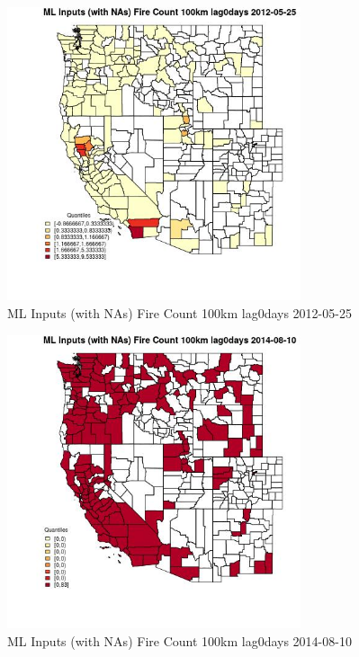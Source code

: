 \begin{figure} 
\centering  
\includegraphics[width=0.77\textwidth]{Code_Outputs/Report_ML_input_PM25_Step4_part_e_de_duplicated_aves_compiled_2019-05-18wNAs_CountyFire_Count_100km_lag0daysMean2012-05-25_2012-05-25.jpg} 
\caption{\label{fig:Report_ML_input_PM25_Step4_part_e_de_duplicated_aves_compiled_2019-05-18wNAsCountyFire_Count_100km_lag0daysMean2012-05-25_2012-05-25}ML Inputs (with NAs) Fire Count 100km lag0days 2012-05-25} 
\end{figure} 
 

\begin{figure} 
\centering  
\includegraphics[width=0.77\textwidth]{Code_Outputs/Report_ML_input_PM25_Step4_part_e_de_duplicated_aves_compiled_2019-05-18wNAs_CountyFire_Count_100km_lag0daysMean2014-08-10_2014-08-10.jpg} 
\caption{\label{fig:Report_ML_input_PM25_Step4_part_e_de_duplicated_aves_compiled_2019-05-18wNAsCountyFire_Count_100km_lag0daysMean2014-08-10_2014-08-10}ML Inputs (with NAs) Fire Count 100km lag0days 2014-08-10} 
\end{figure} 
 

